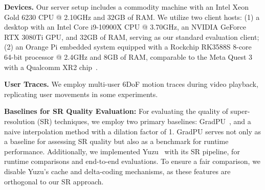 \textbf{Devices.} Our server setup includes a commodity machine with an Intel Xeon Gold 6230 CPU @ 2.10GHz and 32GB of RAM. We utilize two client hosts: (1) a desktop with an Intel Core i9-10900X CPU @ 3.70GHz, an NVIDIA GeForce RTX 3080Ti GPU, and 32GB of RAM, serving as our standard evaluation client; (2) an Orange Pi embedded system equipped with a Rockchip RK3588S 8-core 64-bit processor @ 2.4GHz and 8GB of RAM, comparable to the Meta Quest 3~\cite{metaQuestComparison2024} with a Qualcomm XR2 chip~\cite{qualcommXR22024}.

\textbf{User Traces.} We employ multi-user 6DoF motion traces during video playback, replicating user movements in some experiments.

\textbf{Baselines for SR Quality Evaluation:}
For evaluating the quality of super-resolution (SR) techniques, we employ two primary baselines: GradPU~\cite{he_grad-pu_2023}, and a naive interpolation method with a dilation factor of 1. GradPU serves not only as a baseline for assessing SR quality but also as a benchmark for runtime performance. Additionally, we implemented Yuzu~\cite{zhang_yuzu_nodate} with its SR pipeline, for runtime comparisons and end-to-end evaluations. To ensure a fair comparison, we disable Yuzu’s cache and delta-coding mechanisms, as these features are orthogonal to our SR approach.
















